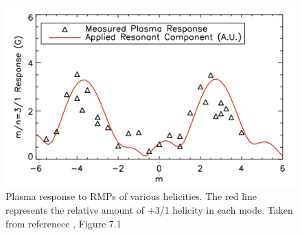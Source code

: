 \documentclass[aps,prl,twocolumn,superscriptaddress,groupedaddress]{revtex4}  %
\begin{document}
\begin{figure}[htb]
	\centering
\includegraphics[scale=.525]{../Plots/Shiraki_thesis_Fig_7_1.png}\caption{Plasma response to RMPs of various helicities.  The red line represents the relative amount of +3/1 helicity in each mode.  Taken from referenece \cite{Shiraki}, Figure 7.1}
	\label{Shiraki_plot}
	\end{figure}
\end{document}

